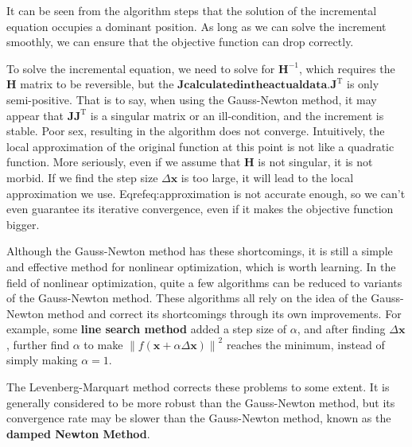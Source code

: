 It can be seen from the algorithm steps that the solution of the incremental equation occupies a dominant position. As long as we can solve the increment smoothly, we can ensure that the objective function can drop correctly.

To solve the incremental equation, we need to solve for $\bm{H}^{-1}$, which requires the $\bm{H}$ matrix to be reversible, but the $\bm{J} \bm{ calculated in the actual data. J}^\mathrm{T}$ is only semi-positive. That is to say, when using the Gauss-Newton method, it may appear that $\bm{J}\bm{J}^\mathrm{T}$ is a singular matrix or an ill-condition, and the increment is stable. Poor sex, resulting in the algorithm does not converge. Intuitively, the local approximation of the original function at this point is not like a quadratic function. More seriously, even if we assume that $\bm{H}$ is not singular, it is not morbid. If we find the step size $\Delta \bm{x}$ is too large, it will lead to the local approximation we use. Eqref{eq:approximation} is not accurate enough, so we can't even guarantee its iterative convergence, even if it makes the objective function bigger.

Although the Gauss-Newton method has these shortcomings, it is still a simple and effective method for nonlinear optimization, which is worth learning.  In the field of nonlinear optimization, quite a few algorithms can be reduced to variants of the Gauss-Newton method.  These algorithms all rely on the idea of the Gauss-Newton method and correct its shortcomings through its own improvements.  For example, some \textbf{line search method} added a step size of $\alpha$, and after finding $\Delta \bm{x}$, further find $\alpha$ to make $\left\| f (\bm{x} + \alpha \Delta \bm{ x}) \right\|^2$ reaches the minimum, instead of simply making $\alpha = 1$.

The Levenberg-Marquart method corrects these problems to some extent. It is generally considered to be more robust than the Gauss-Newton method, but its convergence rate may be slower than the Gauss-Newton method, known as the \textbf{damped Newton Method}.
